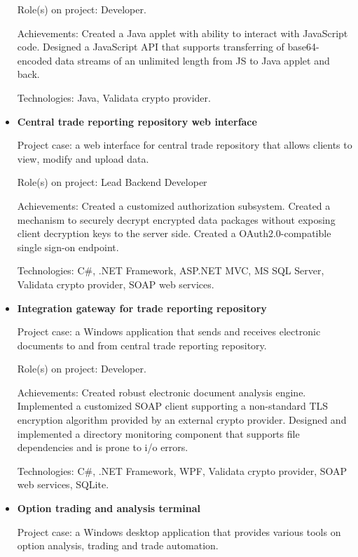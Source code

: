 \documentclass{article}
\begin{document}
\begin{itemize}
{        Role(s) on project: Developer.
        
        Achievements:
        Created a Java applet with ability to interact with JavaScript code.
        Designed a JavaScript API that supports transferring of base64-encoded data streams of an unlimited length from JS to Java applet and back.
        
        Technologies: Java, Validata crypto provider.
    }
    \item {
        \textbf{Central trade reporting repository web interface}
        
        Project case: a web interface for central trade repository that allows clients to view, modify and upload data.
        
        Role(s) on project: Lead Backend Developer
        
        Achievements:
        Created a customized authorization subsystem. 
        Created a mechanism to securely decrypt encrypted data packages without exposing client decryption keys to the server side.
        Created a OAuth2.0-compatible single sign-on endpoint.
        
        Technologies: C\#, .NET Framework, ASP.NET MVC, MS SQL Server, Validata crypto provider, SOAP web services.
    }
    \item {
        \textbf{Integration gateway for trade reporting repository}
        
        Project case: a Windows application that sends and receives electronic documents to and from central trade reporting repository.
        
        Role(s) on project: Developer.
        
        Achievements:
        Created robust electronic document analysis engine.
        Implemented a customized SOAP client supporting a non-standard TLS encryption algorithm provided by an external crypto provider.
        Designed and implemented a directory monitoring component that supports file dependencies and is prone to i/o errors.
        
        Technologies: C\#, .NET Framework, WPF, Validata crypto provider, SOAP web services, SQLite.
    }
    \item {
        \textbf{Option trading and analysis terminal}
        
        Project case: a Windows desktop application that provides various tools on option analysis, trading and trade automation.
        
}
\end{itemize}
\end{document}
